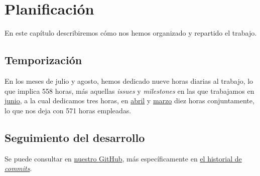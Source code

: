 \chapter{Planificación}
En este capítulo describiremos cómo nos hemos organizado y repartido el trabajo.

\section{Temporización}
En los meses de julio y agosto, hemos dedicado nueve horas diarias al trabajo, lo 
que implica 558 horas, más aquellas \textit{issues} y \textit{milestones} en las que trabajamos en 
\href{https://github.com/ElenaMerelo/TFG/commit/3edf59a755d2be7edc8a07e6b1d5fe5461e018ed}{junio}, a la cual 
dedicamos tres horas, en \href{https://github.com/ElenaMerelo/TFG/commit/336d9af47c0fa0700555fa39a600d3a17019167c}{abril} 
y \href{https://github.com/ElenaMerelo/TFG/commit/a275f335a473a0b67b4ab6415142d4ffe7c393f9}{marzo} diez horas conjuntamente,
lo que nos deja con 571 horas empleadas. 


\section{Seguimiento del desarrollo}
Se puede consultar en \href{https://github.com/ElenaMerelo/TFG}{nuestro GitHub}, más específicamente 
en \href{https://github.com/ElenaMerelo/TFG/commits/master}{el historial de \textit{commits}}. 
